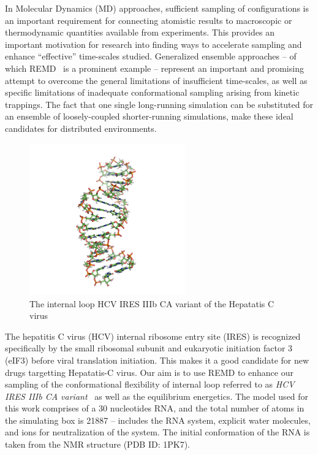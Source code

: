 \documentclass{rspublic}
\newcommand{\jhanote}[1]{ {\textcolor{red} { ***SJ: #1 }}}
\newcommand{\jhanote}[1]{}
\begin{document}

In Molecular Dynamics (MD) approaches, sufficient sampling of
configurations is an important requirement for connecting atomistic
results to macroscopic or thermodynamic quantities available from
experiments.  This provides an important motivation for research into
finding ways to accelerate sampling and enhance ``effective''
time-scales studied. Generalized ensemble approaches -- of which
REMD~\citep{Sugita:1999rm} is a prominent example -- represent an
important and promising attempt to overcome the general limitations of
insufficient time-scales, as well as specific limitations of
inadequate conformational sampling arising from kinetic trappings.
The fact that one single long-running simulation can be substituted
for an ensemble of loosely-coupled shorter-running simulations, make
these ideal candidates for distributed environments.

\begin{figure}[t]
      \centering
      \includegraphics[width=0.6\textwidth]{1KP7}   
      \caption{The internal loop HCV IRES IIIb CA variant of the
        Hepatatis C virus}
      \label{}
\end{figure}

The hepatitis C virus (HCV) internal ribosome entry site (IRES) is
recognized specifically by the small ribosomal subunit and eukaryotic
initiation factor 3 (eIF3) before viral translation initiation.  This
makes it a good candidate for new drugs targetting Hepatatis-C virus.
Our aim is to use REMD to enhance our sampling of the conformational
flexibility of internal loop referred to as {\it HCV IRES IIIb CA
  variant}~\citep{Collier:2002wd} as well as the equilibrium
energetics.  The model used for this work comprises of a 30
nucleotides RNA, and the total number of atoms in the simulating box
is 21887 -- includes the RNA system, explicit water molecules, and
ions for neutralization of the system.  The initial conformation of
the RNA is taken from the NMR structure (PDB ID: 1PK7).  
\end{document}
